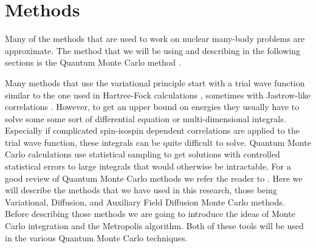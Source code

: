 \section{Methods}
Many of the methods that are used to work on nuclear many-body problems are approximate. The method that we will be using and describing in the following sections is the Quantum Monte Carlo method \cite{carlson2015}.

Many methods that use the variational principle start with a trial wave function similar to the one used in Hartree-Fock calculations \cite{slater1951}, sometimes with Jastrow-like correlations \cite{jastrow1955}. However, to get an upper bound on energies they usually have to solve some some sort of differential equation or multi-dimensional integrals. Especially if complicated spin-isospin dependent correlations are applied to the trial wave function, these integrals can be quite difficult to solve. Quantum Monte Carlo calculations use statistical sampling to get solutions with controlled statistical errors to large integrals that would otherwise be intractable. For a good review of Quantum Monte Carlo methods we refer the reader to \cite{carlson2015,kalos1962,schmidt1999,foulkes2001}. Here we will describe the methods that we have used in this research, those being Variational, Diffusion, and Auxiliary Field Diffusion Monte Carlo methods. Before describing those methods we are going to introduce the ideas of Monte Carlo integration and the Metropolis algorithm. Both of these tools will be used in the various Quantum Monte Carlo techniques.


